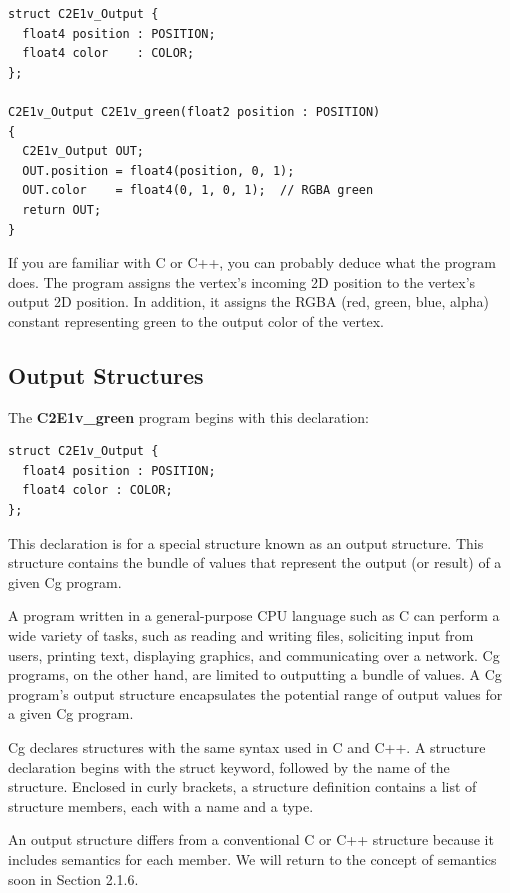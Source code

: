 \documentclass{book}
\begin{document}
\FloatBarrier
\begin{lstlisting}[caption=Example 2-1. The \textbf{C2E1v_green} Vertex Program]
struct C2E1v_Output {
  float4 position : POSITION;
  float4 color    : COLOR;
};

C2E1v_Output C2E1v_green(float2 position : POSITION)
{
  C2E1v_Output OUT;
  OUT.position = float4(position, 0, 1);
  OUT.color    = float4(0, 1, 0, 1);  // RGBA green
  return OUT;
}
\end{lstlisting}
\FloatBarrier

If you are familiar with C or C++, you can probably deduce what the program does. The program assigns the vertex's incoming 2D position to the vertex's output 2D position. In addition, it assigns the RGBA (red, green, blue, alpha) constant representing green to the output color of the vertex.

\subsection{Output Structures}

The \textbf{C2E1v_green} program begins with this declaration:

\FloatBarrier
\begin{lstlisting}
struct C2E1v_Output {
  float4 position : POSITION;
  float4 color : COLOR;
};
\end{lstlisting}
\FloatBarrier

This declaration is for a special structure known as an output structure. This structure contains the bundle of values that represent the output (or result) of a given Cg program.

A program written in a general-purpose CPU language such as C can perform a wide variety of tasks, such as reading and writing files, soliciting input from users, printing text, displaying graphics, and communicating over a network. Cg programs, on the other hand, are limited to outputting a bundle of values. A Cg program's output structure encapsulates the potential range of output values for a given Cg program.

Cg declares structures with the same syntax used in C and C++. A structure declaration begins with the struct keyword, followed by the name of the structure. Enclosed in curly brackets, a structure definition contains a list of structure members, each with a name and a type.

An output structure differs from a conventional C or C++ structure because it includes semantics for each member. We will return to the concept of semantics soon in Section 2.1.6.
\end{document}

